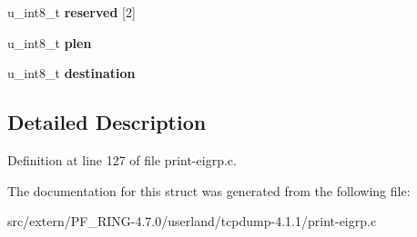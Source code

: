 \begin{DoxyCompactItemize}
\item 
\hypertarget{structeigrp__tlv__ip__int__t_a7b34749d66c79700d8d5d3f50503d714}{
u\_\-int8\_\-t {\bfseries reserved} \mbox{[}2\mbox{]}}
\label{structeigrp__tlv__ip__int__t_a7b34749d66c79700d8d5d3f50503d714}

\item 
\hypertarget{structeigrp__tlv__ip__int__t_ade05dd7f92ff99f33ba99ae68c14fb1f}{
u\_\-int8\_\-t {\bfseries plen}}
\label{structeigrp__tlv__ip__int__t_ade05dd7f92ff99f33ba99ae68c14fb1f}

\item 
\hypertarget{structeigrp__tlv__ip__int__t_a5e6e43282a1acd8f6249f80ddd6fc06d}{
u\_\-int8\_\-t {\bfseries destination}}
\label{structeigrp__tlv__ip__int__t_a5e6e43282a1acd8f6249f80ddd6fc06d}

\end{DoxyCompactItemize}


\subsection{Detailed Description}


Definition at line 127 of file print-\/eigrp.c.



The documentation for this struct was generated from the following file:\begin{DoxyCompactItemize}
\item 
src/extern/PF\_\-RING-\/4.7.0/userland/tcpdump-\/4.1.1/print-\/eigrp.c\end{DoxyCompactItemize}

